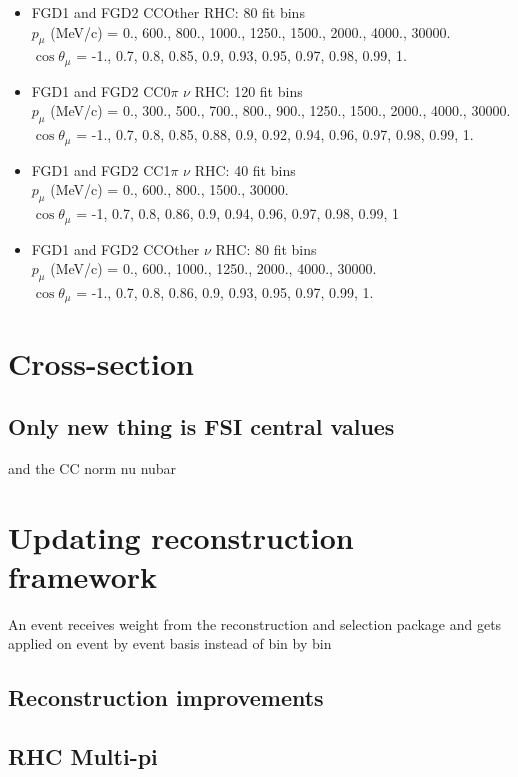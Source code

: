 \begin{itemize}
	\item FGD1 and FGD2 CCOther RHC: 80 fit bins \\
	$p_\mu$ (MeV/c) = 0., 600., 800., 1000., 1250., 1500., 2000., 4000., 30000.\\
	$\cos\theta_\mu$ = -1., 0.7, 0.8, 0.85, 0.9, 0.93, 0.95, 0.97, 0.98, 0.99, 1.
	
	\item FGD1 and FGD2 CC0$\pi$ $\nu$ RHC: 120 fit bins \\
	$p_\mu$ (MeV/c) = 0., 300., 500., 700., 800., 900., 1250., 1500., 2000., 4000., 30000.\\
	$\cos\theta_\mu$ = -1., 0.7, 0.8, 0.85, 0.88, 0.9, 0.92, 0.94, 0.96, 0.97, 0.98, 0.99, 1.
	
	\item FGD1 and FGD2 CC1$\pi$ $\nu$ RHC: 40 fit bins \\
	$p_\mu$ (MeV/c) = 0., 600., 800., 1500., 30000.\\
	$\cos\theta_\mu$ = -1, 0.7, 0.8, 0.86, 0.9, 0.94, 0.96, 0.97, 0.98, 0.99, 1
	
	\item FGD1 and FGD2 CCOther $\nu$ RHC: 80 fit bins \\
	$p_\mu$ (MeV/c) = 0., 600., 1000., 1250., 2000., 4000., 30000.\\
	$\cos\theta_\mu$ = -1., 0.7, 0.8, 0.86, 0.9, 0.93, 0.95, 0.97, 0.99, 1.
\end{itemize}


\section{Cross-section}
\subsection{Only new thing is FSI central values}
and the CC norm nu nubar
\section{Updating reconstruction framework}
An event receives weight from the reconstruction and selection package and gets applied on event by event basis instead of bin by bin
\subsection{Reconstruction improvements}
\subsection{RHC Multi-pi}
